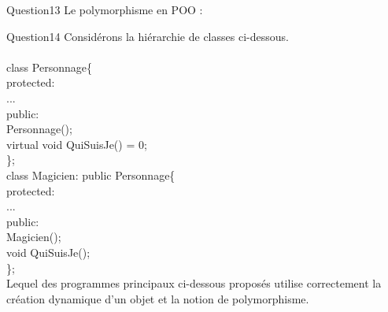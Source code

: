 \documentclass[a4paper]{article}
\begin{document}
{\begin{question}{Question13}
Le polymorphisme en POO :
    \begin{reponses}
    \end{reponses}
\end{question}


\begin{question}{Question14}
Considérons la hiérarchie de classes ci-dessous.\\
\\
class Personnage\{\\
protected:\\
...\\
public:\\
\hspace{1cm}
Personnage();\\
virtual void QuiSuisJe() = 0;\\
\};\\
class Magicien: public Personnage\{\\
protected:\\
...\\
public:\\
Magicien();\\
void QuiSuisJe();\\
\};\\


Lequel des programmes principaux ci-dessous proposés utilise correctement la création dynamique d’un objet et la notion de polymorphisme.
    \begin{reponses}
    \end{reponses}
\end{question}

}
\end{document}
